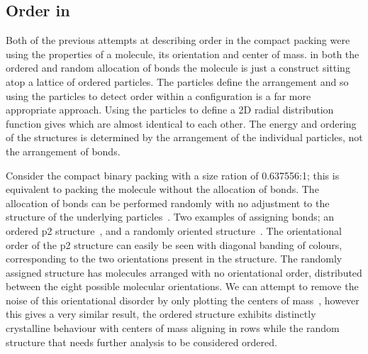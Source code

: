 \subsection{Order in \scon}

Both of the previous attempts at describing order in the compact packing were using the properties of a molecule, its orientation and center of mass. in both the ordered and random allocation of bonds the molecule is just a construct sitting atop a lattice of ordered particles. The particles define the arrangement and so using the particles to detect order within a configuration is a far more appropriate approach. Using the particles to define a 2D radial distribution function gives  which are almost identical to each other. The energy and ordering of the structures is determined by the arrangement of the individual particles, not the arrangement of bonds.

Consider the compact binary packing with a size ration of 0.637556:1; this is equivalent to packing the \scon molecule without the allocation of bonds. The allocation of bonds can be performed randomly with no adjustment to the structure of the underlying particles~. Two examples of assigning bonds; an ordered p2 structure~, and a randomly oriented structure~. The orientational order of the p2 structure can easily be seen with diagonal banding of colours, corresponding to the two orientations present in the structure. The randomly assigned structure has molecules arranged with no orientational order, distributed between the eight possible molecular orientations. We can attempt to remove the noise of this orientational disorder by only plotting the centers of mass~, however this gives a very similar result, the ordered structure exhibits distinctly crystalline behaviour with centers of mass aligning in rows while the random structure that needs further analysis to be considered ordered.

